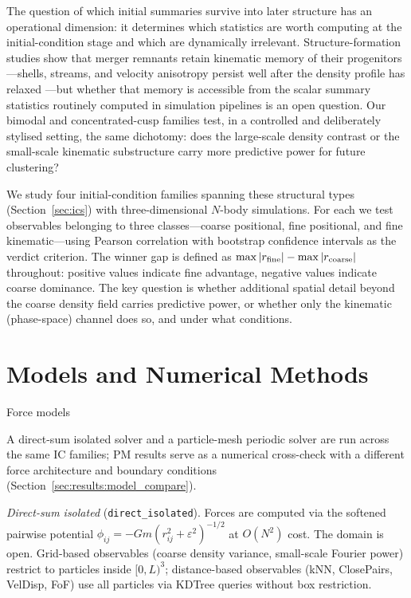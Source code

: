 \documentclass[twocolumn,linenumbers]{aastex701}
\makeatletter
\def\subsection{\@startsection{subsection}{2}{\z@}{9pt plus 1pt minus 1pt}{4pt}%
  {\normalsize\bfseries\center}}
\newcommand{\heps}{\varepsilon}
\makeatother
\begin{document}
The question of which initial summaries survive into later structure
has an operational dimension: it determines which statistics are worth
computing at the initial-condition stage and which are dynamically
irrelevant.  Structure-formation studies show that merger remnants
retain kinematic memory of their progenitors---shells, streams, and
velocity anisotropy persist well after the density profile has relaxed
\citep{White1996,HernquistSpergel1992}---but whether that memory is
accessible from the scalar summary statistics routinely computed in
simulation pipelines is an open question.
Our bimodal and concentrated-cusp families test, in a controlled and
deliberately stylised setting, the same dichotomy: does the
large-scale density contrast or the small-scale kinematic substructure
carry more predictive power for future clustering?

We study four initial-condition families spanning these structural
types (Section~\ref{sec:ics}) with \TotalRuns{} three-dimensional
$N$-body simulations.
For each we test observables belonging to three classes---coarse
positional, fine positional, and fine kinematic---using Pearson
correlation with bootstrap confidence intervals as the verdict
criterion.
The winner gap is defined as $\max|r_{\rm fine}| - \max|r_{\rm coarse}|$
throughout: positive values indicate fine advantage, negative values
indicate coarse dominance.
The key question is whether additional spatial detail beyond the coarse
density field carries predictive power, or whether only the kinematic
(phase-space) channel does so, and under what conditions.


\section{Models and Numerical Methods}
\label{sec:methods}

\subsection{Force models}

A direct-sum isolated solver and a particle-mesh periodic solver are run
across the same IC families; PM results serve as a numerical cross-check
with a different force architecture and boundary conditions
(Section~\ref{sec:results:model_compare}).

\textit{Direct-sum isolated} (\texttt{direct\_isolated}).
Forces are computed via the softened pairwise potential
$\phi_{ij} = -Gm(r_{ij}^2 + \heps^2)^{-1/2}$
at $O(N^2)$ cost.
The domain is open.  Grid-based observables (coarse density variance,
small-scale Fourier power) restrict to particles inside $[0,L)^3$;
distance-based observables (kNN, ClosePairs, VelDisp, FoF) use all
particles via KDTree queries without box restriction.
\end{document}
